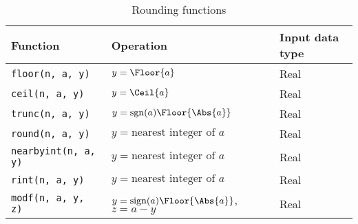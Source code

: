 \begin{table}
  \begin{tabularx}{\textwidth}{LLL}
    \toprule
    Function & Operation & Input data type \\
    \midrule
    \texttt{floor(n, a, y)} & $y = \Floor{a}$                       & Real \\
    \texttt{ceil(n, a, y)}  & $y = \Ceil{a}$                        & Real \\
    \texttt{trunc(n, a, y)} & $y = \mathrm{sgn}(a)\Floor{\Abs{a}}$  & Real \\
    \texttt{round(n, a, y)} & $y = \text{nearest integer of }a$     & Real \\
    \texttt{nearbyint(n, a, y)} & $y = \text{nearest integer of }a$ & Real \\
    \texttt{rint(n, a, y)}  & $y = \text{nearest integer of }a$     & Real \\
    \texttt{modf(n, a, y, z)} &
    $y = \mathrm{sign}(a)\Floor{\Abs{a}}$, $z = a - y$ & Real \\
    \bottomrule
  \end{tabularx}
  \caption{Rounding functions}
  \label{tab:Rounding functions}
\end{table}

\clearpage
